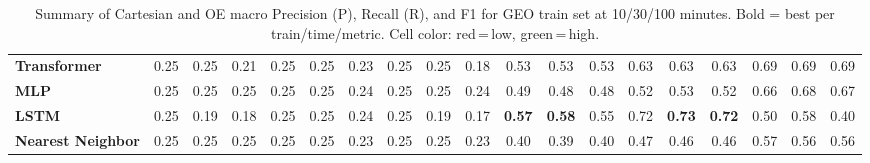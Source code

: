 \begin{table}[t]
{\begin{tabular}{l ccc ccc ccc ccc ccc ccc}
\textbf{Transformer} & \cellcolor[HTML]{FF6B6B}0.25 & \cellcolor[HTML]{FF6B6B}0.25 & \cellcolor[HTML]{FF6B6B}0.21 & \cellcolor[HTML]{FF6B6B}0.25 & \cellcolor[HTML]{FF6B6B}0.25 & \cellcolor[HTML]{FF6B6B}0.23 & \cellcolor[HTML]{FF6B6B}0.25 & \cellcolor[HTML]{FF6B6B}0.25 & \cellcolor[HTML]{FF6B6B}0.18 & \cellcolor[HTML]{EAD340}0.53 & \cellcolor[HTML]{E9D340}0.53 & \cellcolor[HTML]{EAD340}0.53 & \cellcolor[HTML]{A7D151}0.63 & \cellcolor[HTML]{A7D151}0.63 & \cellcolor[HTML]{A7D151}0.63 & \cellcolor[HTML]{7CD05B}0.69 & \cellcolor[HTML]{7AD05C}0.69 & \cellcolor[HTML]{7DD05B}0.69 \\
\textbf{MLP} & \cellcolor[HTML]{FF6B6B}0.25 & \cellcolor[HTML]{FF6B6B}0.25 & \cellcolor[HTML]{FF6B6B}0.25 & \cellcolor[HTML]{FF6B6B}0.25 & \cellcolor[HTML]{FF6B6B}0.25 & \cellcolor[HTML]{FF6B6B}0.24 & \cellcolor[HTML]{FF6B6B}0.25 & \cellcolor[HTML]{FF6B6B}0.25 & \cellcolor[HTML]{FF6B6B}0.24 & \cellcolor[HTML]{FFCE3E}0.49 & \cellcolor[HTML]{FFCD3E}0.48 & \cellcolor[HTML]{FFCC3F}0.48 & \cellcolor[HTML]{F2D43E}0.52 & \cellcolor[HTML]{E8D341}0.53 & \cellcolor[HTML]{EED43F}0.52 & \cellcolor[HTML]{8FD157}0.66 & \cellcolor[HTML]{84D05A}0.68 & \cellcolor[HTML]{8CD157}0.67 \\
\textbf{LSTM} & \cellcolor[HTML]{FF6B6B}0.25 & \cellcolor[HTML]{FF6B6B}0.19 & \cellcolor[HTML]{FF6B6B}0.18 & \cellcolor[HTML]{FF6B6B}0.25 & \cellcolor[HTML]{FF6B6B}0.25 & \cellcolor[HTML]{FF6B6B}0.24 & \cellcolor[HTML]{FF6B6B}0.25 & \cellcolor[HTML]{FF6B6B}0.19 & \cellcolor[HTML]{FF6B6B}0.17 & \cellcolor[HTML]{CDD347}\textbf{0.57} & \cellcolor[HTML]{CAD248}\textbf{0.58} & \cellcolor[HTML]{DFD343}0.55 & \cellcolor[HTML]{68D060}0.72 & \cellcolor[HTML]{62CF62}\textbf{0.73} & \cellcolor[HTML]{69D060}\textbf{0.72} & \cellcolor[HTML]{FDD43C}0.50 & \cellcolor[HTML]{C6D249}0.58 & \cellcolor[HTML]{FFAC4D}0.40 \\
\textbf{Nearest Neighbor} & \cellcolor[HTML]{FF6C6B}0.25 & \cellcolor[HTML]{FF6C6B}0.25 & \cellcolor[HTML]{FF6C6B}0.25 & \cellcolor[HTML]{FF6B6B}0.25 & \cellcolor[HTML]{FF6B6B}0.25 & \cellcolor[HTML]{FF6B6B}0.23 & \cellcolor[HTML]{FF6C6B}0.25 & \cellcolor[HTML]{FF6B6B}0.25 & \cellcolor[HTML]{FF6B6B}0.23 & \cellcolor[HTML]{FFAB4E}0.40 & \cellcolor[HTML]{FFA74F}0.39 & \cellcolor[HTML]{FFA94F}0.40 & \cellcolor[HTML]{FFC642}0.47 & \cellcolor[HTML]{FFC542}0.46 & \cellcolor[HTML]{FFC343}0.46 & \cellcolor[HTML]{CDD347}0.57 & \cellcolor[HTML]{D5D345}0.56 & \cellcolor[HTML]{D6D345}0.56 \\
\bottomrule
\end{tabular}%
}
\caption{Summary of Cartesian and OE macro Precision (P), Recall (R), and F1 for GEO train set at 10/30/100 minutes. Bold = best per train/time/metric. Cell color: red\,=\,low, green\,=\,high.}
\label{tab:class_geo_feat}
\end{table}
